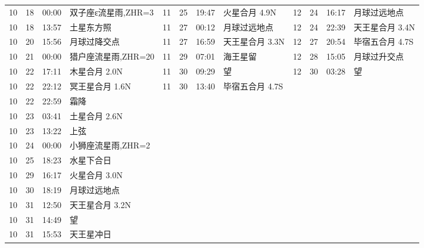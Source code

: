 \begin{tabular}{llll|llll|llll}
10 & 18 & 00:00 & 双子座ε流星雨,ZHR=3 & 11 & 25 & 19:47 & 火星合月 4.9N & 12 & 24 & 16:17 & 月球过远地点 \tabularnewline
10 & 18 & 13:57 & 土星东方照 & 11 & 27 & 00:12 & 月球过远地点 & 12 & 24 & 22:39 & 天王星合月 3.4N \tabularnewline
10 & 20 & 15:56 & 月球过降交点 & 11 & 27 & 16:59 & 天王星合月 3.3N & 12 & 27 & 20:54 & 毕宿五合月 4.7S \tabularnewline
10 & 21 & 00:00 & 猎户座流星雨,ZHR=20 & 11 & 29 & 07:01 & 海王星留 & 12 & 28 & 15:05 & 月球过升交点 \tabularnewline
10 & 22 & 17:11 & 木星合月 2.0N & 11 & 30 & 09:29 & 望 & 12 & 30 & 03:28 & 望 \tabularnewline
10 & 22 & 22:12 & 冥王星合月 1.6N & 11 & 30 & 13:40 & 毕宿五合月 4.7S &  &  &  &  \tabularnewline
10 & 22 & 22:59 & 霜降 &  &  &  &  &  &  &  &  \tabularnewline
10 & 23 & 03:41 & 土星合月 2.6N &  &  &  &  &  &  &  &  \tabularnewline
10 & 23 & 13:22 & 上弦 &  &  &  &  &  &  &  &  \tabularnewline
10 & 24 & 00:00 & 小狮座流星雨,ZHR=2 &  &  &  &  &  &  &  &  \tabularnewline
10 & 25 & 18:23 & 水星下合日 &  &  &  &  &  &  &  &  \tabularnewline
10 & 29 & 16:17 & 火星合月 3.0N &  &  &  &  &  &  &  &  \tabularnewline
10 & 30 & 18:19 & 月球过远地点 &  &  &  &  &  &  &  &  \tabularnewline
10 & 31 & 12:50 & 天王星合月 3.2N &  &  &  &  &  &  &  &  \tabularnewline
10 & 31 & 14:49 & 望 &  &  &  &  &  &  &  &  \tabularnewline
10 & 31 & 15:53 & 天王星冲日 &  &  &  &  &  &  &  &  \tabularnewline
\hline \end{tabular}
